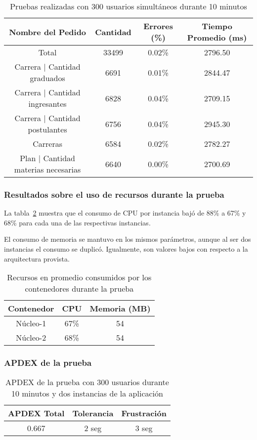 \begin{table}[!htbp]
    \centering
    \makegapedcells
    \begin{tabular}{|c|c|c|c|}
    \hline
    Nombre del Pedido & Cantidad & Errores (\%) & Tiempo Promedio (ms) \\ \hline
    Total & 33499 & 0.02\% & 2796.50\\ \hline
    Carrera | Cantidad graduados & 6691 & 0.01\% & 2844.47\\ \hline
    Carrera | Cantidad ingresantes & 6828 & 0.04\% & 2709.15\\ \hline
    Carrera | Cantidad postulantes & 6756 & 0.04\% & 2945.30\\ \hline
    Carreras & 6584 & 0.02\% & 2782.27\\ \hline
    Plan | Cantidad materias necesarias & 6640 & 0.00\% & 2700.69\\ \hline
    \end{tabular}
    \caption{Pruebas realizadas con 300 usuarios simultáneos durante 10 minutos}
    \label{tab:300u_10m_2i_gen}
\end{table}



\subsubsection{Resultados sobre el uso de recursos durante la prueba}

La tabla~\ref{tab:300u_10m_2i_rec} muestra que el consumo de CPU por instancia bajó de 88\% a 67\% y 68\% para cada una de las respectivas instancias. 

El consumo de memoria se mantuvo en los mismos parámetros, aunque al ser dos instancias el consumo se duplicó. Igualmente, son valores bajos con respecto a la arquitectura provista.
\begin{table}[!htbp]
    \centering
    \makegapedcells
    \begin{tabular}{|c|c|c|}
    \hline
    Contenedor & CPU & Memoria (MB)\\ \hline
    Núcleo-1 & 67\% & 54 \\ \hline
    Núcleo-2 & 68\% & 54 \\ \hline
    \end{tabular}
    \caption{Recursos en promedio consumidos por los contenedores durante la prueba}
    \label{tab:300u_10m_2i_rec}
\end{table}
\subsubsection{APDEX de la prueba}
\begin{table}[!htbp]
    \centering
    \makegapedcells
    \begin{tabular}{|c|c|c|}
    \hline
    APDEX Total & Tolerancia & Frustración\\ \hline
    0.667 & 2 seg & 3 seg \\ \hline
    \end{tabular}
    \caption{APDEX de la prueba con 300 usuarios durante 10 minutos y dos instancias de la aplicación}
    \label{tab:300u_10m_2i_apdex}
\end{table}
\break
